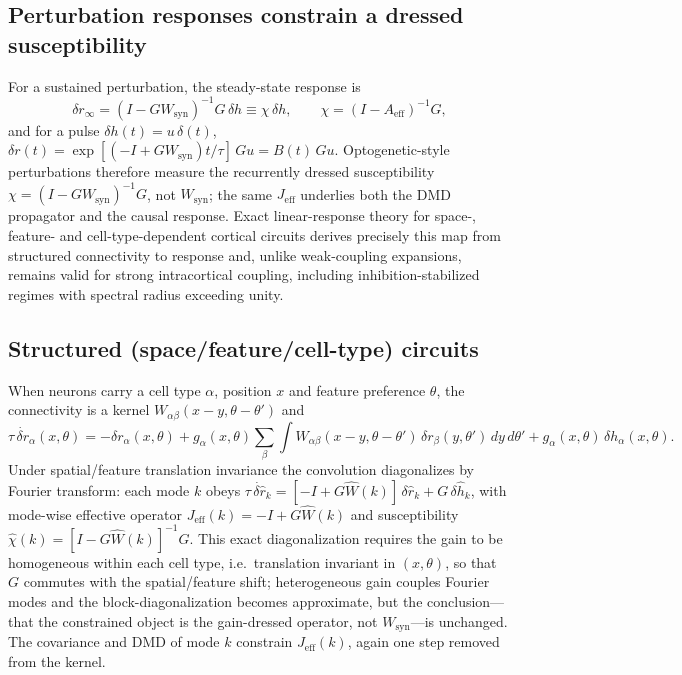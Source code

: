 \documentclass[11pt]{article}
\begin{document}
\subsection{Perturbation responses constrain a dressed susceptibility}
For a sustained perturbation, the steady-state response is
\begin{equation}
\delta r_\infty=(I-GW_{\mathrm{syn}})^{-1}G\,\delta h\equiv\chi\,\delta h,
\qquad \chi=(I-A_{\mathrm{eff}})^{-1}G,
\label{eq:chi}
\end{equation}
and for a pulse $\delta h(t)=u\,\delta(t)$,
$\delta r(t)=\exp[(-I+GW_{\mathrm{syn}})t/\tau]\,Gu=B(t)\,Gu$. Optogenetic-style
perturbations therefore measure the recurrently dressed susceptibility
$\chi=(I-GW_{\mathrm{syn}})^{-1}G$, not $W_{\mathrm{syn}}$; the same
$J_{\mathrm{eff}}$ underlies both the DMD propagator and the causal response.
Exact linear-response theory for space-, feature- and cell-type-dependent
cortical circuits derives precisely this map from structured connectivity to
response and, unlike weak-coupling expansions, remains valid for strong
intracortical coupling, including inhibition-stabilized regimes with spectral
radius exceeding unity\cite{chau2025}.

\subsection{Structured (space/feature/cell-type) circuits}
When neurons carry a cell type $\alpha$, position $x$ and feature preference
$\theta$, the connectivity is a kernel $W_{\alpha\beta}(x-y,\theta-\theta')$ and
\begin{equation}
\tau\,\dot{\delta r}_\alpha(x,\theta)=-\delta r_\alpha(x,\theta)
+g_\alpha(x,\theta)\!\sum_\beta\!\int\! W_{\alpha\beta}(x-y,\theta-\theta')\,
\delta r_\beta(y,\theta')\,dy\,d\theta'
+g_\alpha(x,\theta)\,\delta h_\alpha(x,\theta).
\end{equation}
Under spatial/feature translation invariance the convolution diagonalizes by
Fourier transform: each mode $k$ obeys
$\tau\,\dot{\delta\hat r}_k=[-I+G\hat W(k)]\,\delta\hat r_k+G\,\delta\hat h_k$,
with mode-wise effective operator $J_{\mathrm{eff}}(k)=-I+G\hat W(k)$ and
susceptibility $\hat\chi(k)=[I-G\hat W(k)]^{-1}G$. This exact diagonalization
requires the gain to be homogeneous within each cell type, i.e.\ translation
invariant in $(x,\theta)$, so that $G$ commutes with the spatial/feature shift;
heterogeneous gain couples Fourier modes and the block-diagonalization becomes
approximate, but the conclusion---that the constrained object is the gain-dressed
operator, not $W_{\mathrm{syn}}$---is unchanged. The covariance and DMD of
mode $k$ constrain $J_{\mathrm{eff}}(k)$, again one step removed from the kernel.
\end{document}
